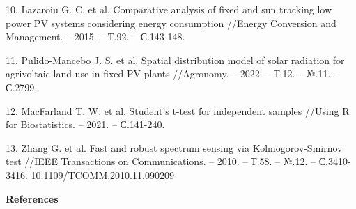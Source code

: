\begin{references}
10. Lazaroiu G. C. et al. Comparative analysis of fixed and sun
tracking low power PV systems considering energy consumption //Energy
Conversion and Management. -- 2015. -- Т.92. -- С.143-148.

11. \href{https://doi.org/10.1016/j.enconman.2014.12.046\%20}{}
Pulido-Mancebo J. S. et al. Spatial distribution model of solar
radiation for agrivoltaic land use in fixed PV plants //Agronomy. --
2022. -- Т.12. -- №.11. -- С.2799.
\href{https://doi.org/10.3390/agronomy12112799}{}

12. MacFarland T. W. et al. Student's t-test for independent samples
//Using R for Biostatistics. -- 2021. -- С.141-240.
\href{https://doi.org/10.1007/978-3-030-62404-0_3}{}

13. Zhang G. et al. Fast and robust spectrum sensing via
Kolmogorov-Smirnov test //IEEE Transactions on Communications. --
2010. -- Т.58. -- №.12. -- С.3410-3416.
10.1109/TCOMM.2010.11.090209
\end{references}

\begin{center}
{\bfseries References}
\end{center}

